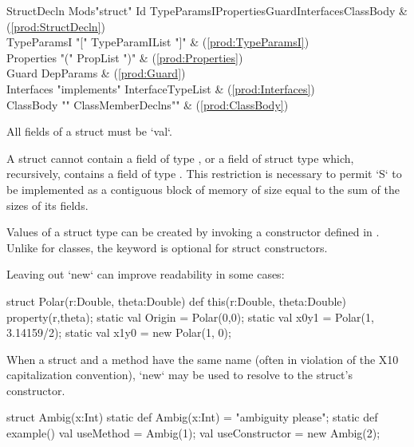 \begin{bbgrammar}
         StructDecln \: Mods\opt \xcd"struct" Id TypeParamsI\opt Properties\opt Guard\opt Interfaces\opt ClassBody & (\ref{prod:StructDecln}) \\
         TypeParamsI \: \xcd"[" TypeParamIList \xcd"]" & (\ref{prod:TypeParamsI}) \\
          Properties \: \xcd"(" PropList \xcd")" & (\ref{prod:Properties}) \\
               Guard \: DepParams & (\ref{prod:Guard}) \\
          Interfaces \: \xcd"implements" InterfaceTypeList & (\ref{prod:Interfaces}) \\
           ClassBody \: \xcd"{" ClassMemberDeclns\opt \xcd"}" & (\ref{prod:ClassBody}) \\
\end{bbgrammar}



All fields of a struct must be \xcd`val`.

A struct  cannot contain a field of type , or a field of struct
type  which, recursively, contains a field of type .  This
restriction is necessary to permit \xcd`S` to be implemented as a contiguous
block of memory of size equal to the sum of the sizes of its fields.  


Values of a struct  type can be created by invoking a constructor
defined in .  Unlike for classes, the   keyword is optional
for struct constructors.  

\begin{ex}
Leaving out \xcd`new` can improve readability in some cases: 
\begin{xten}
struct Polar(r:Double, theta:Double){
  def this(r:Double, theta:Double) {property(r,theta);}
  static val Origin = Polar(0,0);
  static val x0y1   = Polar(1, 3.14159/2);
  static val x1y0   = new Polar(1, 0); 
}
\end{xten}
%


When a struct and a method have the same name (often in violation of the X10
capitalization convention), 
\xcd`new` may be used to resolve to the struct's constructor.  
\begin{xten}
struct Ambig(x:Int) {
  static def Ambig(x:Int) = "ambiguity please";
  static def example() { 
    val useMethod      = Ambig(1);
    val useConstructor = new Ambig(2);
  }
}
\end{xten}
%

\end{ex}

